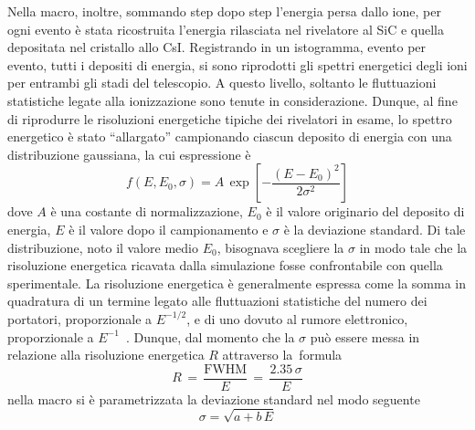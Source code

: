 Nella macro, inoltre, sommando step dopo step l'energia persa dallo ione, per ogni evento è stata ricostruita l'energia rilasciata nel rivelatore al SiC e quella depositata nel cristallo allo CsI.
Registrando in un istogramma, evento per evento, tutti i depositi di energia, si sono riprodotti gli spettri energetici degli ioni per entrambi gli stadi del telescopio.
A questo livello, soltanto le fluttuazioni statistiche legate alla ionizzazione sono tenute in considerazione.
Dunque, al fine di riprodurre le risoluzioni energetiche tipiche dei rivelatori in esame, lo spettro energetico è stato ``allargato'' campionando ciascun deposito di energia con una distribuzione gaussiana, la cui espressione è
\begin{equation}
	f(E, E_0, \sigma) = A \, \exp \left[ - \frac{ \left(E - E_0 \right)^2}{2 {\sigma}^2}  \right]
\end{equation}
dove $A$ è una costante di normalizzazione, $E_0$ è il valore originario del deposito di energia, $E$ è il valore dopo il campionamento e $\sigma$ è la deviazione standard.
Di tale distribuzione, noto il valore medio $E_0$, bisognava scegliere la $\sigma$ in modo tale che la risoluzione energetica ricavata dalla simulazione fosse confrontabile con quella sperimentale.
La risoluzione energetica è generalmente espressa come la somma in quadratura di un termine legato alle fluttuazioni statistiche del numero dei portatori, proporzionale a $E^{-1/2}$, e di uno dovuto al rumore elettronico, proporzionale a $E^{-1}$~\cite{knoll:10}.
Dunque, dal momento che la $\sigma$ può essere messa in relazione alla risoluzione energetica $R$ attraverso la~formula
\begin{equation}
	R \,  = \, \frac{\mbox{FWHM}}{E} \, = \, \frac{2.35 \, \sigma}{E}
\end{equation}
nella macro si è parametrizzata la deviazione standard nel modo seguente
\begin{equation}
\sigma = \sqrt{a + b \, E}
\end{equation}
